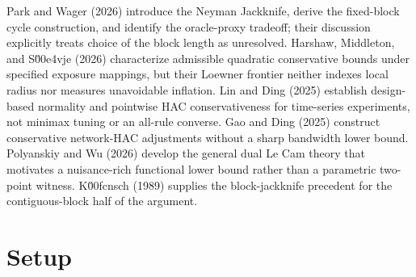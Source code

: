 \documentclass{article}
\begin{document}
Park and Wager (2026) introduce the Neyman Jackknife, derive the fixed-block cycle construction, and identify the oracle-proxy tradeoff; their discussion explicitly treats choice of the block length as unresolved. Harshaw, Middleton, and S\u00e4vje (2026) characterize admissible quadratic conservative bounds under specified exposure mappings, but their Loewner frontier neither indexes local radius nor measures unavoidable inflation. Lin and Ding (2025) establish design-based normality and pointwise HAC conservativeness for time-series experiments, not minimax tuning or an all-rule converse. Gao and Ding (2025) construct conservative network-HAC adjustments without a sharp bandwidth lower bound. Polyanskiy and Wu (2026) develop the general dual Le Cam theory that motivates a nuisance-rich functional lower bound rather than a parametric two-point witness. K\u00fcnsch (1989) supplies the block-jackknife precedent for the contiguous-block half of the argument.

\section{Setup}
\end{document}
